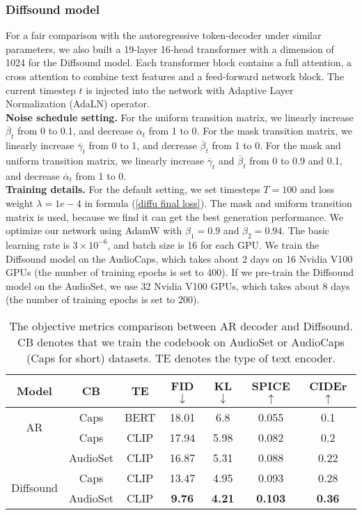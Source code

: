 \documentclass[lettersize,journal]{IEEEtran}
\begin{document}
\subsubsection{Diffsound model} For a fair comparison with the autoregressive token-decoder under similar parameters, we also built a 19-layer 16-head transformer with a dimension of 1024 for the Diffsound model. Each transformer block contains a full attention, a cross attention to combine text features and a feed-forward network block. The current timestep $t$ is injected into the network with Adaptive Layer Normalization \cite{ba2016layer}(AdaLN) operator. \\
\textbf{Noise schedule setting.} For the uniform transition matrix, we linearly increase $\overline{\beta}_t$ from 0 to 0.1, and decrease $\overline{\alpha}_t$ from 1 to 0. For the mask transition matrix, we linearly increase $\overline{\gamma}_t$ from 0 to 1, and decrease $\overline{\beta}_t$ from 1 to 0. For the mask and uniform transition matrix, we linearly increase $\overline{\gamma}_t$ and $\overline{\beta}_t$ from 0 to 0.9 and 0.1, and decrease $\overline{\alpha}_t$ from 1 to 0.\\
\textbf{Training details.} For the default setting, we set timesteps $T = 100$ and loss weight $\lambda = 1e-4$ in formula (\ref{diffu final loss}). The mask and uniform transition matrix is used, because we find it can get the best generation performance. We optimize our network using AdamW \cite{loshchilov2017decoupled} with $\beta_1 = 0.9$ and $\beta_2 = 0.94$. The basic learning rate is $3 \times 10^{-6}$, and batch size is 16 for each GPU. We train the Diffsound model on the AudioCaps, which takes about 2 days on 16 Nvidia V100 GPUs (the number of training epochs is set to 400). If we pre-train the Diffsound model on the AudioSet, we use 32 Nvidia V100 GPUs, which takes about 8 days (the number of training epochs is set to 200).
\begin{table}[t] \centering
\caption{The objective metrics comparison between AR decoder and Diffsound. CB denotes that we train the codebook on AudioSet or AudioCaps (Caps for short) datasets. TE denotes the type of text encoder.}
\label{tab:my-table2}
\begin{tabular}{ccccccc}
\hline
Model                      & CB &TE  & FID$\downarrow$      & KL$\downarrow$      & SPICE$\uparrow$  & CIDEr$\uparrow$  \\ \hline
\multirow{2}{*}{AR}        & Caps &BERT & 18.01     & 6.8   & 0.055      & 0.1  \\
                           & Caps &CLIP & 17.94     & 5.98   & 0.082      & 0.2  \\
                           & AudioSet &CLIP & 16.87    & 5.31   & 0.088      & 0.22  \\ \hline
\multirow{2}{*}{Diffsound} & Caps &CLIP & 13.47      & 4.95   & 0.093     & 0.28 \\
                           & AudioSet &CLIP  & \textbf{9.76} & \textbf{4.21}  & \textbf{0.103} & \textbf{0.36}   \\ \hline
\end{tabular}
\end{table}
\end{document}
